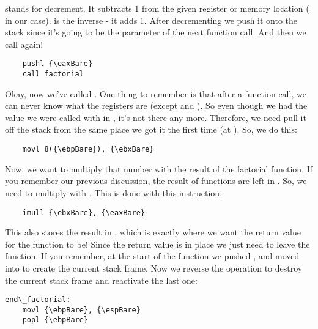  stands for decrement.  It subtracts 1 from
the given register or memory location ({\eaxReg} in our case).  
 is the
inverse - it adds 1.  After decrementing {\eaxReg}
we push it onto the stack since it's going to be the parameter of
the next function call.  And then we call  again!

\begin{simpletyping}
\begin{lstlisting}
	pushl {\eaxBare}
	call factorial
\end{lstlisting}
\end{simpletyping}

Okay, now we've called .  One thing to remember 
is that after a function call, we can never know what the registers are
(except \icode{{\espBare}} and \icode{{\ebpBare}}).  So
even though we had the value we were called with in \icode{{\eaxBare}},
it's not there any more.  Therefore, we need pull it off the stack
from the same place we got it the first time (at 
).
So, we do this:

\begin{simpletyping}
\begin{lstlisting}
	movl 8({\ebpBare}), {\ebxBare}
\end{lstlisting}
\end{simpletyping}

Now, we want to multiply that number with the result of the
factorial function.  If you remember our previous discussion,
the result of functions are left in {\eaxReg}.
So, we need to multiply {\ebxReg} with {\eaxReg}.
This is done with this instruction:

\begin{simpletyping}
\begin{lstlisting}
	imull {\ebxBare}, {\eaxBare}
\end{lstlisting}
\end{simpletyping}

This also stores the result in {\eaxReg}, which is
exactly where we want the return value for the function to be!  Since
the return value is in place
we just need to leave the function.  If you remember, at the
start of the function we pushed {\ebpReg}, and
moved {\espReg} into {\ebpReg} to create the current stack frame.  Now
we reverse the operation to destroy the current stack frame and 
reactivate the last one:

\begin{simpletyping}
\begin{lstlisting}
end\_factorial:
	movl {\ebpBare}, {\espBare}
	popl {\ebpBare}
\end{lstlisting}
\end{simpletyping}

